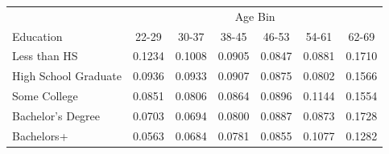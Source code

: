 \begin{tabular}{lcccccc}
\hline\hline
 & \multicolumn{6}{c}{Age Bin} \\
Education & 22-29 & 30-37 & 38-45 & 46-53 & 54-61 & 62-69 \\
\hline
Less than HS&0.1234&0.1008&0.0905&0.0847&0.0881&0.1710\\
High School Graduate&0.0936&0.0933&0.0907&0.0875&0.0802&0.1566\\
Some College&0.0851&0.0806&0.0864&0.0896&0.1144&0.1554\\
Bachelor's Degree&0.0703&0.0694&0.0800&0.0887&0.0873&0.1728\\
Bachelors+&0.0563&0.0684&0.0781&0.0855&0.1077&0.1282\\
\hline\hline
\end{tabular}
